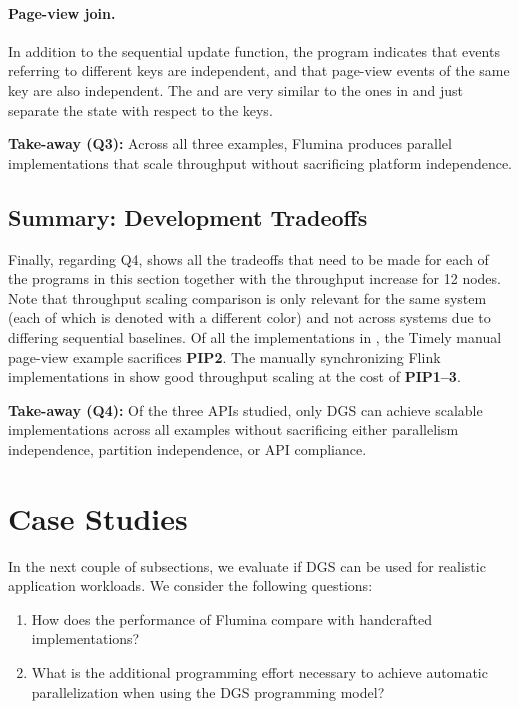\paragraph{Page-view join.}
In addition to the sequential update function, the program indicates that events referring to different keys are independent, and that page-view events of the same key are also independent. The  and  are very similar to the ones in  and just separate the state with respect to the keys.

\begin{takeaway}
\textbf{Take-away (Q3):}
Across all three examples,
Flumina produces parallel implementations that scale throughput without sacrificing platform independence.
\end{takeaway}

\subsection{Summary: Development Tradeoffs}
\label{dgs:ssec:eval-development-tradeoffs}

Finally, regarding Q4,
 shows all the tradeoffs that need to be made for each of the programs in this section together with the throughput increase for 12 nodes.
Note that throughput scaling comparison is only relevant for the same system (each of which is denoted with a different color) and not across systems due to differing sequential baselines.
Of all the implementations in , the Timely manual page-view example sacrifices \textbf{PIP2}.
The manually synchronizing Flink implementations in  show good throughput scaling at the cost of \textbf{PIP1--3}.

\begin{takeaway}
\textbf{Take-away (Q4):}
Of the three APIs studied,
only DGS can achieve scalable implementations across
all examples without sacrificing either parallelism independence, partition independence, or API compliance.
\end{takeaway}

\section{Case Studies}
\label{dgs:appendix:case-studies}

In the next couple of subsections, we evaluate if DGS can be used for realistic application workloads.
We consider the following questions:
\begin{enumerate}
    \item How does the performance of Flumina compare with handcrafted implementations?
    \item What is the additional programming effort necessary to achieve automatic parallelization when using the DGS programming model?
\end{enumerate}

